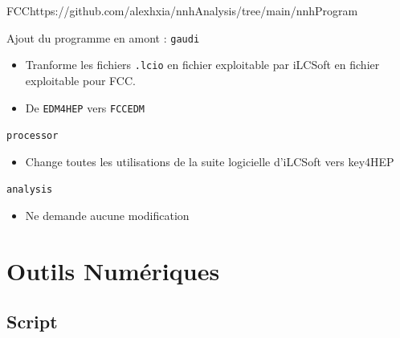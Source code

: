 \documentclass[9pt]{beamer}
\begin{document}
\begin{frame}{FCC}{https://github.com/alexhxia/nnhAnalysis/tree/main/nnhProgram}

	\begin{block}{Ajout du programme en amont : \texttt{gaudi}}
		\begin{itemize}
			\item Tranforme les fichiers \texttt{.lcio} en fichier exploitable par iLCSoft en fichier exploitable pour FCC.
			\item De \texttt{EDM4HEP} vers \texttt{FCCEDM}
		\end{itemize}
	\end{block}

	\begin{block}{\texttt{processor}}
		\begin{itemize}
			\item Change toutes les utilisations de la suite logicielle d'iLCSoft vers key4HEP
		\end{itemize}
	\end{block}

	\begin{block}{\texttt{analysis}}
		\begin{itemize}
			\item Ne demande aucune modification
		\end{itemize}
	\end{block}

\end{frame}

\section{Outils Numériques}

\subsection{Script}
\end{document}
